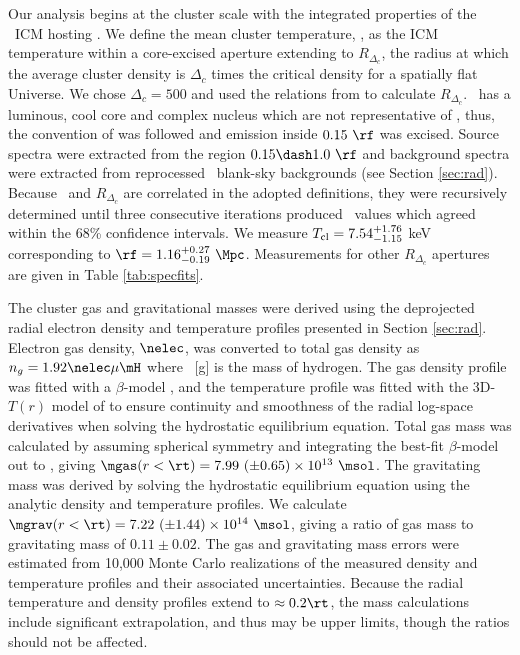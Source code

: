 \documentclass[useAMS,usenatbib]{mn2e}
\begin{document}
Our analysis begins at the cluster scale with the integrated
properties of the \rxj\ ICM hosting \irs. We define the mean cluster
temperature, \cltx, as the ICM temperature within a core-excised
aperture extending to $R_{\Delta_c}$, the radius at which the average
cluster density is $\Delta_c$ times the critical density for a
spatially flat Universe. We chose $\Delta_c = 500$ and used the
relations from \cite{2002A&A...389....1A} to calculate
$R_{\Delta_c}$. \rxj\ has a luminous, cool core and complex nucleus
which are not representative of \cltx, thus, the convention of
\citet{2007ApJ...668..772M} was followed and emission inside $0.15
~\rf$ was excised. Source spectra were extracted from the region $0.15
\dash 1.0~\rf$ and background spectra were extracted from reprocessed
\caldb\ blank-sky backgrounds (see Section \ref{sec:rad}). Because
\cltx\ and $R_{\Delta_c}$ are correlated in the adopted definitions,
they were recursively determined until three consecutive iterations
produced \cltx\ values which agreed within the 68\% confidence
intervals. We measure $T_{\mathrm{cl}} = 7.54^{+1.76}_{-1.15}$ keV corresponding
to $\rf = 1.16^{+0.27}_{-0.19}~\Mpc$. Measurements for other
$R_{\Delta_c}$ apertures are given in Table \ref{tab:specfits}.

The cluster gas and gravitational masses were derived using the
deprojected radial electron density and temperature profiles presented
in Section \ref{sec:rad}. Electron gas density, $\nelec$, was
converted to total gas density as $n_g = 1.92 \nelec \mu \mH$ where
\mH\ [g] is the mass of hydrogen. The gas density profile was fitted
with a $\beta$-model \citep{betamodel}, and the temperature profile
was fitted with the 3D-$T(r)$ model of \citet{2006ApJ...640..691V} to
ensure continuity and smoothness of the radial log-space derivatives
when solving the hydrostatic equilibrium equation. Total gas mass was
calculated by assuming spherical symmetry and integrating the best-fit
$\beta$-model out to \rt, giving $\mgas(r<\rt) = 7.99 ~(\pm 0.65)
\times 10^{13} ~\msol$. The gravitating mass was derived by solving
the hydrostatic equilibrium equation using the analytic density and
temperature profiles. We calculate $\mgrav(r<\rt) = 7.22 ~(\pm 1.44)
\times 10^{14} ~\msol$, giving a ratio of gas mass to gravitating mass
of $0.11 \pm 0.02$. The gas and gravitating mass errors were estimated
from 10,000 Monte Carlo realizations of the measured density and
temperature profiles and their associated uncertainties. Because the
radial temperature and density profiles extend to $\approx 0.2 \rt$,
the mass calculations include significant extrapolation, and thus may
be upper limits, though the ratios should not be affected.
\end{document}
